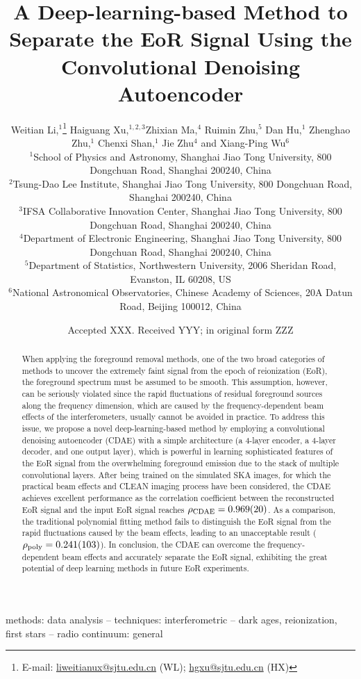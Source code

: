 \documentclass[letters,fleqn,usenatbib,onecolumn]{mnras}
\title[EoR Separation with CDAE]{%
  A Deep-learning-based Method to Separate the EoR Signal
  Using the Convolutional Denoising Autoencoder
}
\author[Li~et~al.]{%
Weitian Li,$^{1}$\thanks{E-mail:
  \href{mailto:liweitianux@sjtu.edu.cn}{liweitianux@sjtu.edu.cn} (WL);
  \href{mailto:hgxu@sjtu.edu.cn}{hgxu@sjtu.edu.cn} (HX)}
Haiguang Xu,$^{1,2,3}$\footnotemark[1]
Zhixian Ma,$^{4}$
Ruimin Zhu,$^{5}$
Dan Hu,$^{1}$
Zhenghao Zhu,$^{1}$
\newauthor
Chenxi Shan,$^{1}$
Jie Zhu$^{4}$
and
Xiang-Ping Wu$^{6}$
\\
$^{1}${School of Physics and Astronomy,
  Shanghai Jiao Tong University,
  800 Dongchuan Road, Shanghai 200240, China} \\
$^{2}${Tsung-Dao Lee Institute,
  Shanghai Jiao Tong University,
  800 Dongchuan Road, Shanghai 200240, China} \\
$^{3}${IFSA Collaborative Innovation Center,
  Shanghai Jiao Tong University,
  800 Dongchuan Road, Shanghai 200240, China} \\
$^{4}${Department of Electronic Engineering,
  Shanghai Jiao Tong University,
  800 Dongchuan Road, Shanghai 200240, China} \\
$^{5}${Department of Statistics,
  Northwestern University,
  2006 Sheridan Road, Evanston, IL 60208, US} \\
$^{6}${National Astronomical Observatories,
  Chinese Academy of Sciences,
  20A Datun Road, Beijing 100012, China}
}
\date{Accepted XXX. Received YYY; in original form ZZZ}
\newcommand{\R}[1]{\mathrm{#1}}
\begin{document}
\label{firstpage}
\pagerange{\pageref{firstpage}--\pageref{lastpage}}
\maketitle

%
%
\begin{abstract}
{\color{cyan}%
When applying the foreground removal methods, one of the two broad
categories of methods to uncover the extremely faint signal from the
epoch of reionization (EoR), the foreground spectrum must be assumed
to be smooth.
This assumption, however, can be seriously violated since the rapid
fluctuations of residual foreground sources along the frequency
dimension, which are caused by the frequency-dependent beam effects of
the interferometers, usually cannot be avoided in practice.
To address this issue, we propose a novel deep-learning-based method
by employing a convolutional denoising autoencoder (CDAE) with a simple
architecture (a 4-layer encoder, a 4-layer decoder, and one output layer),
which is powerful in learning sophisticated features of the EoR signal
from the overwhelming foreground emission due to the stack of multiple
convolutional layers.
After being trained on the simulated SKA images, for which the practical
beam effects and CLEAN imaging process have been considered,
the CDAE achieves excellent performance as the correlation coefficient
between the reconstructed EoR signal and the input EoR signal reaches
$\rho_{\R{CDAE}} = \num{0.969 +- 0.020}$.
As a comparison, the traditional polynomial fitting method fails to
distinguish the EoR signal from the rapid fluctuations caused by the
beam effects, leading to an unacceptable result
($\rho_{\R{poly}} = \num{0.241 +- 0.103}$).
In conclusion, the CDAE can overcome the frequency-dependent beam effects
and accurately separate the EoR signal, exhibiting the great potential
of deep learning methods in future EoR experiments.} %
\end{abstract}

\begin{keywords}
methods: data analysis --
techniques: interferometric --
dark ages, reionization, first stars --
radio continuum: general
\end{keywords}


\end{document}
